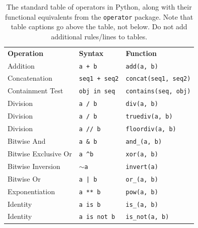 \documentclass{l4proj}
\begin{document}
\begin{table}[]
    \caption{The standard table of operators in Python, along with their functional equivalents from the \texttt{operator} package. Note that table
    captions go above the table, not below. Do not add additional rules/lines to tables. }\label{tab:operators}
    \begin{tabular}{@{}lll@{}}
    \textbf{Operation}    & \textbf{Syntax}                & \textbf{Function}                            \\ %
    Addition              & \texttt{a + b}                          & \texttt{add(a, b)}                                    \\
    Concatenation         & \texttt{seq1 + seq2}                    & \texttt{concat(seq1, seq2)}                           \\
    Containment Test      & \texttt{obj in seq}                     & \texttt{contains(seq, obj)}                           \\
    Division              & \texttt{a / b}                          & \texttt{div(a, b) }  \\
    Division              & \texttt{a / b}                          & \texttt{truediv(a, b) } \\
    Division              & \texttt{a // b}                         & \texttt{floordiv(a, b)}                               \\
    Bitwise And           & \texttt{a \& b}                         & \texttt{and\_(a, b)}                                  \\
    Bitwise Exclusive Or  & \texttt{a \textasciicircum b}           & \texttt{xor(a, b)}                                    \\
    Bitwise Inversion     & \texttt{$\sim$a}                        & \texttt{invert(a)}                                    \\
    Bitwise Or            & \texttt{a | b}                          & \texttt{or\_(a, b)}                                   \\
    Exponentiation        & \texttt{a ** b}                         & \texttt{pow(a, b)}                                    \\
    Identity              & \texttt{a is b}                         & \texttt{is\_(a, b)}                                   \\
    Identity              & \texttt{a is not b}                     & \texttt{is\_not(a, b)}                                \\

\end{tabular}
\end{table}
\end{document}
